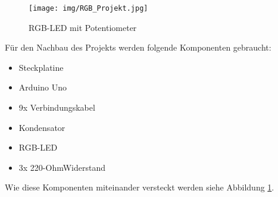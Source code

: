 \begin{figure}[h]
\begin{center}
\texttt{[image: img/RGB\_Projekt.jpg]}
\caption{RGB-LED mit Potentiometer}
\label{rgb_project}
\end{center}
\end{figure}

Für den Nachbau des Projekts werden folgende Komponenten gebraucht:
\begin{itemize}
\item{Steckplatine}
\item{Arduino Uno}
\item{9x Verbindungskabel}
\item{Kondensator}
\item{RGB-LED}
\item{3x 220-OhmWiderstand}
\end{itemize}

Wie diese Komponenten miteinander versteckt werden siehe Abbildung \ref{rgb_project}.

